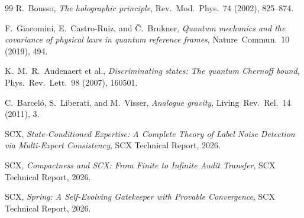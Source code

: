 \documentclass[12pt,a4paper]{article}
\theoremstyle{remark}
\begin{document}
\begin{thebibliography}{99}
R.~Bousso,
\emph{The holographic principle},
Rev.~Mod.~Phys.~74 (2002), 825--874.

F.~Giacomini, E.~Castro-Ruiz, and \v{C}.~Brukner,
\emph{Quantum mechanics and the covariance of physical laws in quantum reference frames},
Nature~Commun.~10 (2019), 494.

K.~M.~R.~Audenaert et al.,
\emph{Discriminating states: The quantum Chernoff bound},
Phys.~Rev.~Lett.~98 (2007), 160501.

C.~Barcel\'o, S.~Liberati, and M.~Visser,
\emph{Analogue gravity},
Living~Rev.~Rel.~14 (2011), 3.

SCX,
\emph{State-Conditioned Expertise: A Complete Theory of Label Noise Detection via Multi-Expert Consistency},
SCX Technical Report, 2026.

SCX,
\emph{Compactness and SCX: From Finite to Infinite Audit Transfer},
SCX Technical Report, 2026.

SCX,
\emph{Spring: A Self-Evolving Gatekeeper with Provable Convergence},
SCX Technical Report, 2026.

\end{thebibliography}
\end{document}
